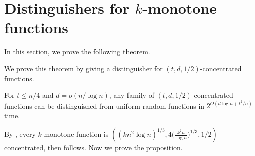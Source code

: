 \documentclass{toc}
\newcommand{\warn}[1]{#1}
\begin{document}
\section{Distinguishers for $k$-monotone functions}

In this section, we prove the following theorem.

\distinguisher*

We prove this theorem by giving a distinguisher for $(t,d,1/2)$-concentrated functions.

\begin{proposition}
For $t\leq n/4$ and $d=o(n/\log n)$, any family of $(t,d,1/2)$-concentrated functions can be distinguished from uniform random functions in
$2^{O(d\log n + t^2/n)}$ time.
\end{proposition}

By , every $k$-monotone function is \warn{ $\left((kn^2\log{n})^{1/3},4\big(\frac{k^2n}{\log n}\big)^{1/3},1/2\right)$}-concentrated, then  follows. Now we prove the proposition.
\end{document}
